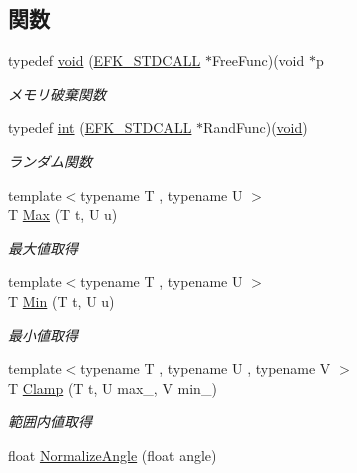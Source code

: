 \subsection*{関数}
\begin{DoxyCompactItemize}
\item 
typedef \mbox{\hyperlink{namespace_effekseer_ab34c4088e512200cf4c2716f168deb56}{void}} (\mbox{\hyperlink{_effekseer_8h_a4b2fd0bd069299f55649055bbd485d7f}{E\+F\+K\+\_\+\+S\+T\+D\+C\+A\+LL}} $\ast$Free\+Func)(void $\ast$p
\begin{DoxyCompactList}\small\item\em メモリ破棄関数 \end{DoxyCompactList}\item 
typedef \mbox{\hyperlink{namespace_effekseer_ace0abf7c2e6947e519ebe8b54cbcc30a}{int}} (\mbox{\hyperlink{_effekseer_8h_a4b2fd0bd069299f55649055bbd485d7f}{E\+F\+K\+\_\+\+S\+T\+D\+C\+A\+LL}} $\ast$Rand\+Func)(\mbox{\hyperlink{namespace_effekseer_ab34c4088e512200cf4c2716f168deb56}{void}})
\begin{DoxyCompactList}\small\item\em ランダム関数 \end{DoxyCompactList}\item 
{\footnotesize template$<$typename T , typename U $>$ }\\T \mbox{\hyperlink{namespace_effekseer_afc3d4e56cf4f8d0f12ac7d4bee7591b9}{Max}} (T t, U u)
\begin{DoxyCompactList}\small\item\em 最大値取得 \end{DoxyCompactList}\item 
{\footnotesize template$<$typename T , typename U $>$ }\\T \mbox{\hyperlink{namespace_effekseer_ad4d523c19d4088c7566fadd84449eba7}{Min}} (T t, U u)
\begin{DoxyCompactList}\small\item\em 最小値取得 \end{DoxyCompactList}\item 
{\footnotesize template$<$typename T , typename U , typename V $>$ }\\T \mbox{\hyperlink{namespace_effekseer_a524a62e3d5b25946bcccd60ffe448c9c}{Clamp}} (T t, U max\+\_\+, V min\+\_\+)
\begin{DoxyCompactList}\small\item\em 範囲内値取得 \end{DoxyCompactList}\item 
float \mbox{\hyperlink{namespace_effekseer_a6607039efc8f6bb91f8c216dfd096c5c}{Normalize\+Angle}} (float angle)

\end{DoxyCompactItemize}
